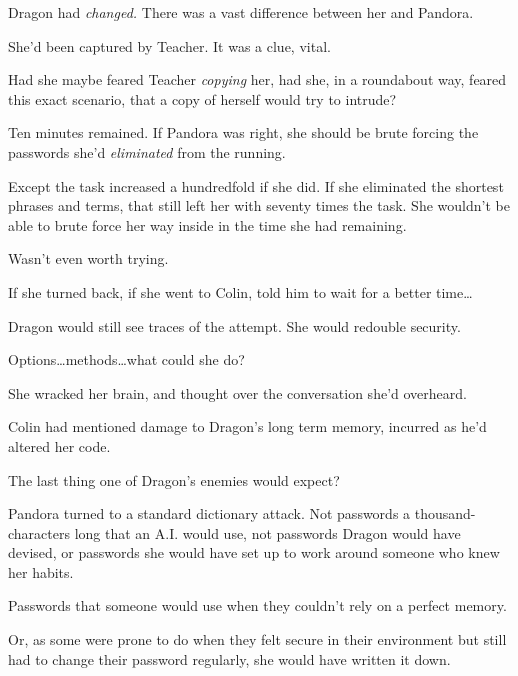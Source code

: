 Dragon had \emph{changed.  }There was a vast difference between her and Pandora.



She'd been captured by Teacher.  It was a clue, vital.



Had she maybe feared Teacher \emph{copying} her, had she, in a roundabout way, feared this exact scenario, that a copy of herself would try to intrude?



Ten minutes remained.  If Pandora was right, she should be brute forcing the passwords she'd \emph{eliminated} from the running.



Except the task increased a hundredfold if she did.  If she eliminated the shortest phrases and terms, that still left her with seventy times the task.  She wouldn't be able to brute force her way inside in the time she had remaining.



Wasn't even worth trying.



If she turned back, if she went to Colin, told him to wait for a better time\ldots



Dragon would still see traces of the attempt.  She would redouble security.



Options\ldots methods\ldots what could she do?



She wracked her brain, and thought over the conversation she'd overheard.



Colin had mentioned damage to Dragon's long term memory, incurred as he'd altered her code.



The last thing one of Dragon's enemies would expect?



Pandora turned to a standard dictionary attack.  Not passwords a thousand-characters long that an A.I. would use, not passwords Dragon would have devised, or passwords she would have set up to work around someone who knew her habits.



Passwords that someone would use when they couldn't rely on a perfect memory.



Or, as some were prone to do when they felt secure in their environment but still had to change their password regularly, she would have written it down.



